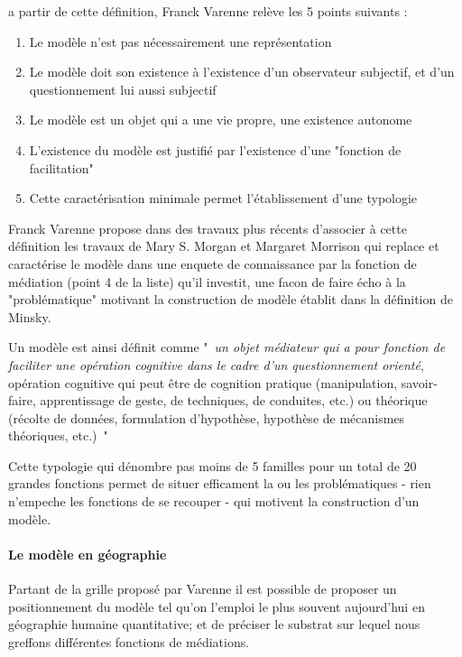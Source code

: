 a partir de cette définition, Franck Varenne \autocite{Varenne2008} relève les 5 points suivants : 
\begin{enumerate}
  \item Le modèle n'est pas nécessairement une représentation
  \item Le modèle doit son existence à l'existence d'un observateur subjectif, et d'un questionnement lui aussi subjectif
  \item Le modèle est un objet qui a une vie propre, une existence autonome
  \item L'existence du modèle est justifié par l'existence d'une "fonction de facilitation"
  \item Cette caractérisation minimale permet l'établissement d'une typologie
\end{enumerate}

Franck Varenne propose dans des travaux plus récents \autocite{Varenne2013} d'associer à cette définition les travaux de Mary S. Morgan et Margaret Morrison qui replace et caractérise le modèle dans une enquete de connaissance par la fonction de médiation (point 4 de la liste) qu'il investit, une facon de faire écho à la "problématique" motivant la construction de modèle établit dans la définition de Minsky.

Un modèle est ainsi définit comme " \textit{un objet médiateur qui a pour fonction de faciliter une opération cognitive dans le cadre d'un questionnement orienté}, opération cognitive qui peut être de cognition pratique (manipulation, savoir-faire, apprentissage de geste, de techniques, de conduites, etc.) ou théorique (récolte de données, formulation d'hypothèse, hypothèse de mécanismes théoriques, etc.) " \autocite{Varenne2013}

Cette typologie qui dénombre pas moins de 5 familles pour un total de 20 grandes fonctions permet de situer efficament la ou les problématiques - rien n'empeche les fonctions de se recouper - qui motivent la construction d'un modèle. 

\paragraph{Le modèle en géographie}


 
Partant de la grille proposé par Varenne \autocite{Varenne2013} il est possible de proposer un positionnement du modèle tel qu'on l'emploi le plus souvent aujourd'hui en géographie humaine quantitative; et de préciser le substrat sur lequel nous greffons différentes fonctions de médiations.

